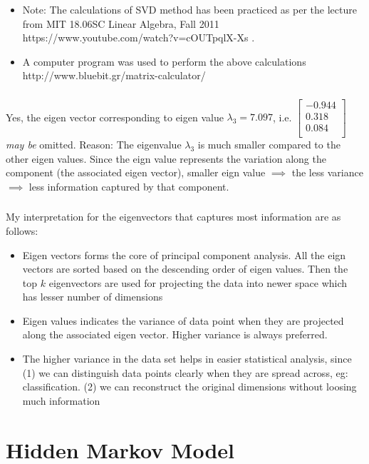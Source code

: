 \documentclass[a4paper,doc,notimes]{article}
\begin{document}
\begin{itemize}
	\item Note: The calculations of SVD method has been practiced as per the lecture from MIT 18.06SC Linear Algebra, Fall 2011 https://www.youtube.com/watch?v=cOUTpqlX-Xs .
	\item A computer program was used to perform the above calculations http://www.bluebit.gr/matrix-calculator/
\end{itemize}

\subsubsection{}
Yes, the eigen vector corresponding to eigen value $ \lambda_3=7.097$,  i.e. $\begin{bmatrix} -0.944  \\	0.318  \\ 	0.084 \\ \end{bmatrix} $ \textit{may be} omitted.
Reason: The eigenvalue $\lambda_3 $ is much smaller compared to the other eigen values. Since the eign value represents the variation along the component (the associated eigen vector), smaller eign value $\implies$ the less variance $\implies$ less information captured by that component.
\subsubsection{}
My interpretation for the eigenvectors that captures most information are as follows:
\begin{itemize}
	\item Eigen vectors forms the core of principal component analysis. All the eign vectors are sorted based on the descending order of eigen values. Then the top $k$ eigenvectors are used for projecting the data into newer space which has lesser number of dimensions
	\item Eigen values indicates the variance of data point when they are projected along the associated eigen vector. Higher variance is always preferred.
	\item The higher variance in the data set helps in easier statistical analysis, since (1) we can distinguish data points clearly when they are spread across, eg: classification. (2) we can reconstruct the original dimensions without loosing much information 
\end{itemize}

\section{Hidden Markov Model}
\renewcommand{\thesubsection}{\thesection.\alph{subsection}}
\end{document}
